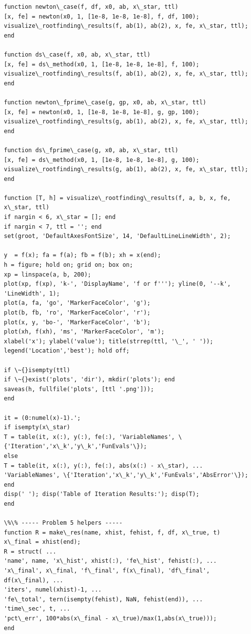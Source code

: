 \documentclass[11pt]{article}
\begin{document}
\begin{lstlisting}[basicstyle=\ttfamily\small]
function newton\_case(f, df, x0, ab, x\_star, ttl)
[x, fe] = newton(x0, 1, [1e-8, 1e-8, 1e-8], f, df, 100);
visualize\_rootfinding\_results(f, ab(1), ab(2), x, fe, x\_star, ttl);
end

function ds\_case(f, x0, ab, x\_star, ttl)
[x, fe] = ds\_method(x0, 1, [1e-8, 1e-8, 1e-8], f, 100);
visualize\_rootfinding\_results(f, ab(1), ab(2), x, fe, x\_star, ttl);
end

function newton\_fprime\_case(g, gp, x0, ab, x\_star, ttl)
[x, fe] = newton(x0, 1, [1e-8, 1e-8, 1e-8], g, gp, 100);
visualize\_rootfinding\_results(g, ab(1), ab(2), x, fe, x\_star, ttl);
end

function ds\_fprime\_case(g, x0, ab, x\_star, ttl)
[x, fe] = ds\_method(x0, 1, [1e-8, 1e-8, 1e-8], g, 100);
visualize\_rootfinding\_results(g, ab(1), ab(2), x, fe, x\_star, ttl);
end

function [T, h] = visualize\_rootfinding\_results(f, a, b, x, fe, x\_star, ttl)
if nargin < 6, x\_star = []; end
if nargin < 7, ttl = ''; end
set(groot, 'DefaultAxesFontSize', 14, 'DefaultLineLineWidth', 2);

y  = f(x); fa = f(a); fb = f(b); xh = x(end);
h = figure; hold on; grid on; box on;
xp = linspace(a, b, 200);
plot(xp, f(xp), 'k-', 'DisplayName', 'f or f'''); yline(0, '--k', 'LineWidth', 1);
plot(a, fa, 'go', 'MarkerFaceColor', 'g');
plot(b, fb, 'ro', 'MarkerFaceColor', 'r');
plot(x, y, 'bo-', 'MarkerFaceColor', 'b');
plot(xh, f(xh), 'ms', 'MarkerFaceColor', 'm');
xlabel('x'); ylabel('value'); title(strrep(ttl, '\_', ' '));
legend('Location','best'); hold off;

if \~{}isempty(ttl)
if \~{}exist('plots', 'dir'), mkdir('plots'); end
saveas(h, fullfile('plots', [ttl '.png']));
end

it = (0:numel(x)-1).';
if isempty(x\_star)
T = table(it, x(:), y(:), fe(:), 'VariableNames', \{'Iteration','x\_k','y\_k','FunEvals'\});
else
T = table(it, x(:), y(:), fe(:), abs(x(:) - x\_star), ...
'VariableNames', \{'Iteration','x\_k','y\_k','FunEvals','AbsError'\});
end
disp(' '); disp('Table of Iteration Results:'); disp(T);
end

\%\% ----- Problem 5 helpers -----
function R = make\_res(name, xhist, fehist, f, df, x\_true, t)
x\_final = xhist(end);
R = struct( ...
'name', name, 'x\_hist', xhist(:), 'fe\_hist', fehist(:), ...
'x\_final', x\_final, 'f\_final', f(x\_final), 'df\_final', df(x\_final), ...
'iters', numel(xhist)-1, ...
'fe\_total', tern(isempty(fehist), NaN, fehist(end)), ...
'time\_sec', t, ...
'pct\_err', 100*abs(x\_final - x\_true)/max(1,abs(x\_true)));
end


\end{lstlisting}
\end{document}
